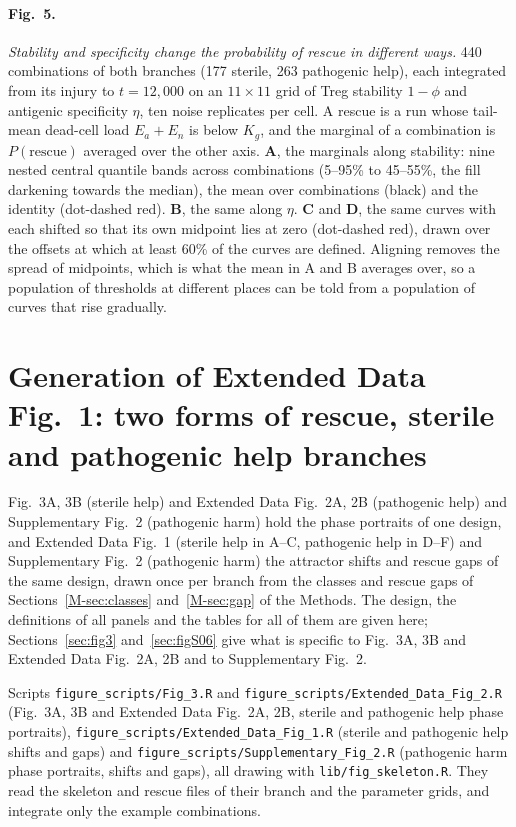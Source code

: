 \documentclass[11pt]{article}
\begin{document}
\paragraph{Fig.~5.}
\emph{Stability and specificity change the probability of rescue in different
ways.} 440 combinations of both branches (177 sterile, 263 pathogenic help),
each integrated from its injury to $t = 12{,}000$ on an $11\times11$ grid of
Treg stability $1-\phi$ and antigenic specificity $\eta$, ten noise replicates
per cell. A rescue is a run whose tail-mean dead-cell load $E_a + E_n$ is below
$K_g$, and the marginal of a combination is $P(\text{rescue})$ averaged over the
other axis. \textbf{A}, the marginals along stability: nine nested central
quantile bands across combinations (5--95\% to 45--55\%, the fill darkening
towards the median), the mean over combinations (black) and the identity
(dot-dashed red). \textbf{B}, the same along $\eta$. \textbf{C} and \textbf{D},
the same curves with each shifted so that its own midpoint lies at zero
(dot-dashed red), drawn over the offsets at which at least 60\% of the curves
are defined. Aligning removes the spread of midpoints, which is what the mean in
A and B averages over, so a population of thresholds at different places can be
told from a population of curves that rise gradually.

\section{Generation of Extended Data Fig.~1: two forms of rescue, sterile and pathogenic help branches}
\label{sec:figS01}

Fig.~3A, 3B (sterile help) and Extended Data Fig.~2A, 2B (pathogenic help) and Supplementary Fig.~2 (pathogenic harm) hold the phase portraits of one design, and Extended Data Fig.~1 (sterile help in A--C, pathogenic help in D--F) and Supplementary Fig.~2
(pathogenic harm) the attractor shifts and rescue gaps of the same design, drawn once per
branch from the classes and rescue gaps of
Sections~\ref{M-sec:classes} and~\ref{M-sec:gap} of the Methods. The design, the definitions of all
panels and the tables for all of them are given here; Sections~\ref{sec:fig3}
and~\ref{sec:figS06} give what is specific to Fig.~3A, 3B and Extended Data Fig.~2A, 2B and to Supplementary Fig.~2.

Scripts \texttt{figure\_scripts/Fig\_3.R} and \texttt{figure\_scripts/Extended\_Data\_Fig\_2.R} (Fig.~3A, 3B and Extended Data Fig.~2A, 2B, sterile and pathogenic help phase portraits),
\texttt{figure\_scripts/Extended\_Data\_Fig\_1.R} (sterile and pathogenic help shifts and gaps) and
\texttt{figure\_scripts/Supplementary\_Fig\_2.R} (pathogenic harm phase portraits, shifts and gaps), all drawing with
\texttt{lib/fig\_skeleton.R}. They read the skeleton and rescue files of their branch
and the parameter grids, and integrate only the example combinations.
\end{document}
